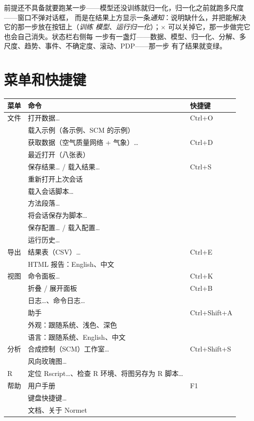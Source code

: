 \documentclass[11pt]{ctexrep}
\begin{document}
前提还不具备就要跑某一步——模型还没训练就归一化，归一化之前就跑多尺度——窗口不弹对话框，
而是在结果上方显示一条\emph{通知}：说明缺什么，并把能解决它的那一步放在按钮上（\emph{训练
模型}、\emph{运行归一化}）；\(\times\) 可以关掉它，那一步做完它也会自己消失。状态栏右侧每
一步有一盏灯——数据、模型、归一化、分解、多尺度、趋势、事件、不确定度、滚动、PDP——那一步
有了结果就变绿。

\section{菜单和快捷键}
\begin{center}\small
\begin{tabular}{@{}lll@{}}
\toprule
菜单 & 命令 & 快捷键 \\
\midrule
文件     & 打开数据…                            & Ctrl+O \\
         & 载入示例（各示例、SCM 的示例）       & \\
         & 获取数据（空气质量网络 + 气象）…     & Ctrl+D \\
         & 最近打开（八张表）                   & \\
         & 保存结果… / 载入结果…                & Ctrl+S \\
         & 重新打开上次会话                     & \\
         & 载入会话脚本…                        & \\
         & 方法段落…                            & \\
         & 将会话保存为脚本…                    & \\
         & 保存配置… / 载入配置…                & \\
         & 运行历史…                            & \\
导出     & 结果表（CSV）…                        & Ctrl+E \\
         & HTML 报告：English、中文             & \\
视图     & 命令面板…                            & Ctrl+K \\
         & 折叠 / 展开面板                      & Ctrl+B \\
         & 日志…、命令日志…                     & \\
         & 助手                                 & Ctrl+Shift+A \\
         & 外观：跟随系统、浅色、深色           & \\
         & 语言：跟随系统、English、中文        & \\
分析     & 合成控制（SCM）工作室…               & Ctrl+Shift+S \\
         & 风向玫瑰图…                          & \\
R        & 定位 Rscript…、检查 R 环境、将图另存为 R 脚本… & \\
帮助     & 用户手册                             & F1 \\
         & 键盘快捷键…                          & \\
         & 文档、关于 Normet                    & \\
\bottomrule
\end{tabular}
\end{center}
\end{document}
